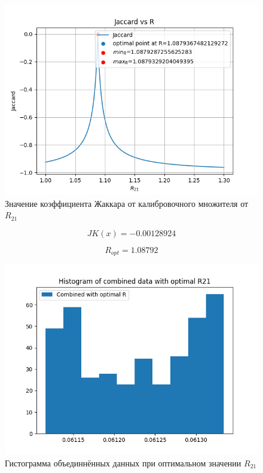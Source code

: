 \documentclass[../main.tex]{subfiles}
\begin{document}
\begin{figure}[H]
	\begin{center}{}
		\includegraphics[scale=0.5]{figures/jakkar.png}
	\end{center}
	\caption{Значение коэффициента Жаккара от калибровочного множителя от $R_{21}$} 
\end{figure}
        \begin{equation}
            JK(x) = -0.00128924
        \end{equation}
        
        \begin{equation}
            R_{opt} = 1.08792
        \end{equation}


\begin{figure}[H]
	\begin{center}
		\includegraphics[scale=0.5]{figures/jakkar_combined_hist.png}
	\end{center}
	\caption{Гистограмма объединнённых данных при оптимальном значении $R_{21}$} 
\end{figure}
\end{document}
